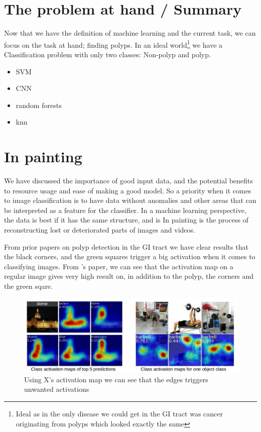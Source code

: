 	
	
	  
	  
\section{The problem at hand / Summary}
	  Now that we have the definition of machine learning and the current task, we can focus on the task at hand; finding polyps. In an ideal world\footnote{Ideal as in the only disease we could get in  the GI tract was cancer originating
	  from polyps which looked exactly the same} we have a
	  Classification problem with only two classes: Non-polyp and polyp. 
	  
	  \begin{itemize}
	    \item SVM 
	    \item CNN 
	    \item random forests
	    \item knn
	  \end{itemize}

\iffalse
\section{In painting}
  We have discussed the importance of good input data, and the potential benefits to resource usage and ease of making a good model.
  So a priority when it comes to image classification is to have data without anomalies and other areas that can be interpreted as a feature for the classifier. 
  In a machine learning perspective, the data is best if it has the same structure, and is %
  In painting is the process of reconstructing lost or deteriorated parts of images and videos. %
  

  From prior papers on polyp detection in the GI tract %
  we have clear results that the black corners, and the green squares trigger a big activation %
  when it comes to classifying images. 
  From %
  's paper, we can see that the activation map on a regular image gives very high result on, in addition to the polyp, the corners and the green sqare. 
  \begin{figure}[ht]
    \centering
    \includegraphics[scale=0.5]{background/figures/placeholder.jpeg}
    \caption{Using X's activation map we can see that the edges triggers unwanted activations}
  \end{figure}
  
